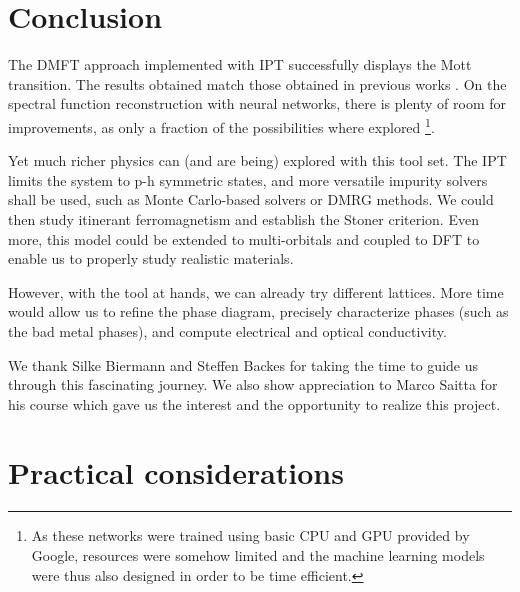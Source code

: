 \documentclass[reprint,amsmath,amssymb,aps,pra]{revtex4-2}
\begin{document}
\section{Conclusion}

The DMFT approach implemented with IPT successfully displays the Mott transition. The results obtained match those obtained in previous works \cite{Georges1996}. On the spectral function reconstruction with neural networks, there is plenty of room for improvements, as only a fraction of the possibilities where explored \footnote{As these networks were trained using basic CPU and GPU provided by Google, resources were somehow limited and the machine learning models were thus also designed in order to be time efficient.}.

Yet much richer physics can (and are being) explored with this tool set. The IPT limits the system to p-h symmetric states, and more versatile impurity solvers shall be used, such as Monte Carlo-based solvers or DMRG methods. We could then study itinerant ferromagnetism and establish the Stoner criterion. Even more, this model could be extended to multi-orbitals and coupled to DFT to enable us to properly study realistic materials.

However, with the tool at hands, we can already try different lattices. More time would allow us to refine the phase diagram, precisely characterize phases (such as the bad metal phases), and compute electrical and optical conductivity.

\begin{acknowledgments}
We thank Silke Biermann and Steffen Backes for taking the time to guide us through this fascinating journey. We also show appreciation to Marco Saitta for his course which gave us the interest and the opportunity to realize this project.
\end{acknowledgments}

\clearpage
\appendix
{}

\section{\label{app:practical-consideration}Practical considerations}
\end{document}
